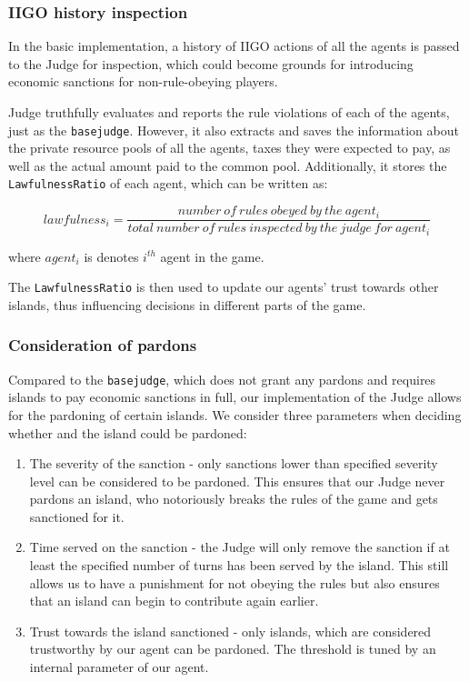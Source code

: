 \subsubsection{IIGO history inspection}
\label{subsubsec:team4:judge:inspect_history}
In the basic implementation, a history of IIGO actions of all the agents is passed to the Judge for inspection, which could become grounds for introducing economic sanctions for non-rule-obeying players. 

Judge truthfully evaluates and reports the rule violations of each of the agents, just as the \texttt{basejudge}. However, it also extracts and saves the information about the private resource pools of all the agents, taxes they were expected to pay, as well as the actual amount paid to the common pool. Additionally, it stores the \texttt{LawfulnessRatio} of each agent, which can be written as:


\begin{equation}
    lawfulness_{i} = \frac{number\:of\:rules\:obeyed\:by\:the\:agent_{i}}{total\:number\:of\:rules\:inspected\:by\:the\:judge\:for\:agent_{i}}
\end{equation}

where $agent_{i}$ is denotes $i^{th}$ agent in the game.  

The \texttt{LawfulnessRatio} is then used to update our agents' trust towards other islands, thus influencing decisions in different parts of the game. 

\subsubsection{Consideration of pardons}
Compared to the \texttt{basejudge}, which does not grant any pardons and requires islands to pay economic sanctions in full, our implementation of the Judge allows for the pardoning of certain islands. We consider three parameters when deciding whether and the island could be pardoned:

\begin{enumerate}
    \item The severity of the sanction - only sanctions lower than specified severity level can be considered to be pardoned. This ensures that our Judge never pardons an island, who notoriously breaks the rules of the game and gets sanctioned for it.
    \item Time served on the sanction - the Judge will only remove the sanction if at least the specified number of turns has been served by the island. This still allows us to have a punishment for not obeying the rules but also ensures that an island can begin to contribute again earlier.
    \item Trust towards the island sanctioned - only islands, which are considered trustworthy by our agent can be pardoned. The threshold is tuned by an internal parameter of our agent.
\end{enumerate}

